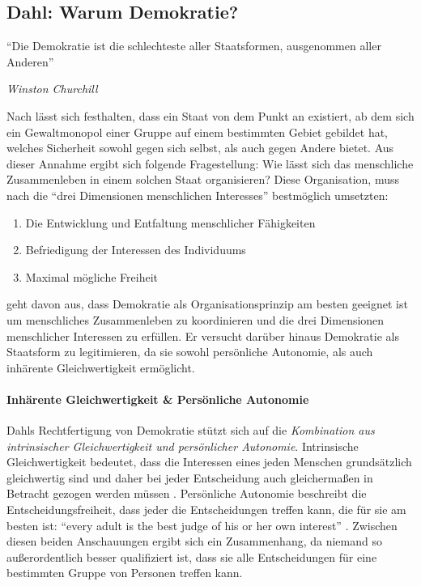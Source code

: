 \subsection{Dahl: Warum Demokratie?}

\epigraph{
		``Die Demokratie ist die schlechteste aller Staatsformen, ausgenommen aller Anderen''
		}
	{
		\emph{Winston Churchill
	}

Nach \citeauthor{Tilly-1985-aa} lässt sich festhalten, dass ein Staat von dem Punkt an existiert, ab dem sich ein Gewaltmonopol einer Gruppe auf einem bestimmten Gebiet gebildet hat, welches Sicherheit sowohl gegen sich selbst, als auch gegen Andere bietet.
Aus dieser Annahme ergibt sich folgende Fragestellung:
Wie lässt sich das menschliche Zusammenleben in einem solchen Staat organisieren?
Diese Organisation, muss nach \citeauthor{Dahl-1989-aa} die ``drei Dimensionen menschlichen Interesses'' bestmöglich umsetzten:

	\begin{enumerate}
		\item Die Entwicklung und Entfaltung menschlicher Fähigkeiten

		\item Befriedigung der Interessen des Individuums

		\item Maximal mögliche Freiheit \citep[88]{Dahl-1989-aa}
	\end{enumerate}

\citeauthor{Dahl-1989-aa} geht davon aus, dass Demokratie als Organisationsprinzip am besten geeignet ist um menschliches Zusammenleben zu koordinieren und die drei Dimensionen menschlicher Interessen zu erfüllen.
Er versucht darüber hinaus Demokratie als Staatsform zu legitimieren, da sie sowohl persönliche Autonomie, als auch inhärente Gleichwertigkeit ermöglicht.


\paragraph*{Inhärente Gleichwertigkeit & Persönliche Autonomie}

Dahls Rechtfertigung von Demokratie stützt sich auf die \emph{Kombination aus intrinsischer Gleichwertigkeit und persönlicher Autonomie}.
Intrinsische Gleichwertigkeit bedeutet, dass die Interessen eines jeden Menschen grundsätzlich gleichwertig sind und daher bei jeder Entscheidung auch gleichermaßen in Betracht gezogen werden müssen \citep[vgl.][100]{Dahl-1989-aa}.
Persönliche Autonomie beschreibt die Entscheidungsfreiheit, dass jeder die Entscheidungen treffen kann, die für sie am besten ist: ``every adult is the best judge of his or her own interest'' \citep[100]{Dahl-1989-aa}.
Zwischen diesen beiden Anschauungen ergibt sich ein Zusammenhang, da niemand so außerordentlich besser qualifiziert ist, dass sie alle Entscheidungen für eine bestimmten Gruppe von Personen treffen kann.

}
